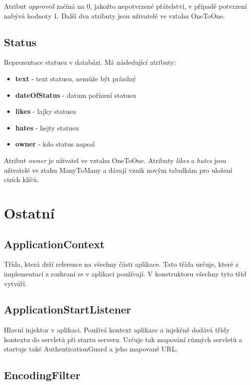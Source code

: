 \documentclass[
12pt,
a4paper,
pdftex,
czech,
titlepage
]{report}
\begin{document}
Atribut \textit{approved} začíná na 0, jakožto nepotvrzené přátelství, v případě potvrzení nabývá hodnoty 1. Další dva atributy jsou uživatelé ve vztahu OneToOne.


\subsection{Status}

Reprezentace statusu v databázi. Má následující atributy:

\begin{itemize}
\item \textbf{text} - text statusu, nemůže být prázdný
\item \textbf{dateOfStatus} - datum pořízení statusu
\item \textbf{likes} - lajky statusu
\item \textbf{hates} - hejty statusu
\item \textbf{owner} - kdo status napsal
\end{itemize}

Atribut \textit{owner} je uživatel ve vztahu OneToOne. Atributy \textit{likes} a \textit{hates} jsou uživatelé ve ztahu ManyToMany a dávají vznik novým tabulkám pro uložení cizích klíčů.

\section{Ostatní}

\subsection{ApplicationContext}

Třída, která drží reference na všechny části aplikace. Tato třída určuje, které z implementací z rozhraní se v aplikaci používají. V konstruktoru všechny tyto tříd vytváří.

\subsection{ApplicationStartListener}

Hlavní injektor v aplikaci. Používá kontext aplikace a injekčně dodává třídy kontextu do servletů při startu serveru. Určuje tak mapování různých servletů a startuje také AuthenticationGuard a jeho mapované URL. 

\subsection{EncodingFilter}
\end{document}
